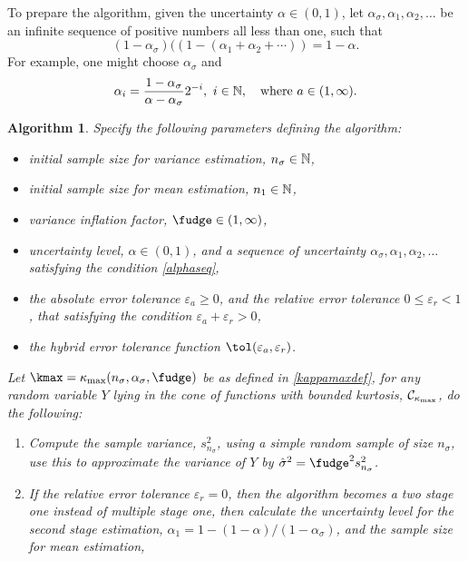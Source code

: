 \documentclass{iitthesis}
\newtheorem{algorithm}[theorem]{Algorithm}
\begin{document}
To prepare the algorithm, given the uncertainty $\alpha \in (0,1)$, let $\alpha_{\sigma}, \alpha_1,  \alpha_2, \ldots$ be an infinite sequence of positive numbers all less than one, such that 
\begin{equation} \label{alphaseq}
(1-\alpha_{\sigma})((1-(\alpha_1+\alpha_2+\cdots)) = 1-\alpha.
\end{equation}
For example, one might choose $\alpha_{\sigma}$ and 
\begin{equation} \label{alphaseqex}
\alpha_{i} = \frac{1-\alpha_\sigma}{\alpha-\alpha_\sigma} 2^{-i}, \ i\in \mathbb{N}, \quad \text{where} \  a \in (1,\infty).
\end{equation}
\begin{algorithm}\label{meanMCg} 
Specify the following parameters defining the algorithm:
\begin{itemize}
\item initial sample size for variance estimation, $n_{\sigma} \in \mathbb{N}$,
\item initial sample size for mean estimation, $n_1 \in \mathbb{N}$,
\item variance inflation factor, $\fudge \in (1,\infty)$, 
\item uncertainty level, $\alpha\in (0,1)$, and a sequence of uncertainty $ \alpha_\sigma, \alpha_1,  \alpha_2, \ldots$ satisfying the condition \eqref{alphaseq}, 
\item the absolute error tolerance $\varepsilon_a \geq 0$, and the relative error tolerance $0 \leq \varepsilon_r <1$, that satisfying the condition $\varepsilon_a+\varepsilon_r >0$,
\item the hybrid error tolerance function $\tol(\varepsilon_a,\varepsilon_r)$.
\end{itemize} 
Let $\kmax=\kappa_{\max}(n_\sigma,\alpha_\sigma,\fudge)$ be as defined in \eqref{kappamaxdef}, for any random variable $Y$ lying in the cone of functions with bounded kurtosis, $\mathcal{C}_{\kappa_{\max}}$, do the following:
\begin{enumerate}
\item Compute the sample variance, $s^2_{n_{\sigma}}$, using a simple random sample of size $n_\sigma$, use this to approximate the variance of $Y$ by $\hsigma^2 = \fudge^2 s^2_{n_\sigma}$. 
\item If the relative error tolerance $\varepsilon_r=0$, then the algorithm becomes a two stage one instead of multiple stage one, then calculate the uncertainty level for the second stage estimation, $\alpha_1 = 1-(1-\alpha)/(1-\alpha_\sigma)$, and the sample size for mean estimation,

\end{enumerate}
\end{algorithm}
\end{document}
